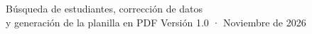 \documentclass[11pt,letterpaper,oneside]{report}
\begin{document}
  {Búsqueda de estudiantes, corrección de datos\\y generación de la planilla en PDF}
  {Versión 1.0 · Noviembre de 2026}

\tableofcontents




\end{document}
